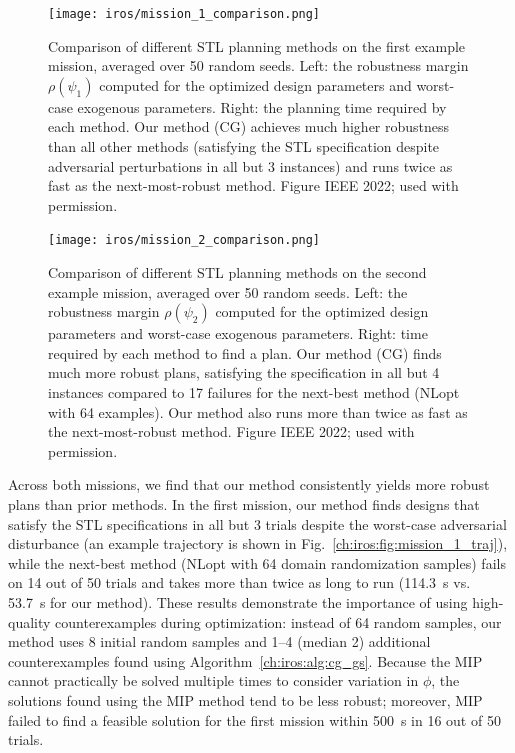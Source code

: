 \begin{figure}[tbh]
    \centering
    \texttt{[image: iros/mission\_1\_comparison.png]}
    \caption{Comparison of different STL planning methods on the first example mission, averaged over 50 random seeds. Left: the robustness margin $\rho(\psi_1)$ computed for the optimized design parameters and worst-case exogenous parameters. Right: the planning time required by each method. Our method (CG) achieves much higher robustness than all other methods (satisfying the STL specification despite adversarial perturbations in all but 3 instances) and runs twice as fast as the next-most-robust method. Figure \textcopyright{} IEEE 2022; used with permission.}
    \label{ch:iros:fig:mission_1_comparison}
\end{figure}

\begin{figure}[tbh]
    \centering
    \texttt{[image: iros/mission\_2\_comparison.png]}
    \caption{Comparison of different STL planning methods on the second example mission, averaged over 50 random seeds. Left: the robustness margin $\rho(\psi_2)$ computed for the optimized design parameters and worst-case exogenous parameters. Right: time required by each method to find a plan. Our method (CG) finds much more robust plans, satisfying the specification in all but 4 instances compared to 17 failures for the next-best method (NLopt with 64 examples). Our method also runs more than twice as fast as the next-most-robust method. Figure \textcopyright{} IEEE 2022; used with permission.}
    \label{ch:iros:fig:mission_2_comparison}
\end{figure}

Across both missions, we find that our method consistently yields more robust plans than prior methods. In the first mission, our method finds designs that satisfy the STL specifications in all but 3 trials despite the worst-case adversarial disturbance (an example trajectory is shown in Fig.~\ref{ch:iros:fig:mission_1_traj}), while the next-best method (NLopt with 64 domain randomization samples) fails on 14 out of 50 trials and takes more than twice as long to run (\SI{114.3}{s} vs. \SI{53.7}{s} for our method). These results demonstrate the importance of using high-quality counterexamples during optimization: instead of 64 random samples, our method uses 8 initial random samples and 1--4 (median 2) additional counterexamples found using Algorithm~\ref{ch:iros:alg:cg_gs}. Because the MIP cannot practically be solved multiple times to consider variation in $\phi$, the solutions found using the MIP method tend to be less robust; moreover, MIP failed to find a feasible solution for the first mission within \SI{500}{s} in 16 out of 50 trials.

